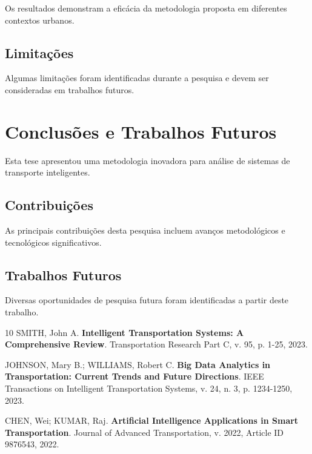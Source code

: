 \documentclass[doutorado,onehalfspacing,12pt,hyperref]{UnB-PPGT}
\begin{document}
Os resultados demonstram a eficácia da metodologia proposta em diferentes contextos urbanos.

\section{Limitações}
\label{sec:limitacoes}

Algumas limitações foram identificadas durante a pesquisa e devem ser consideradas em trabalhos futuros.

\chapter{Conclusões e Trabalhos Futuros}
\label{cap:conclusoes}

Esta tese apresentou uma metodologia inovadora para análise de sistemas de transporte inteligentes.

\section{Contribuições}
\label{sec:contribuicoes}

As principais contribuições desta pesquisa incluem avanços metodológicos e tecnológicos significativos.

\section{Trabalhos Futuros}
\label{sec:futuros}

Diversas oportunidades de pesquisa futura foram identificadas a partir deste trabalho.

\postextual

\begin{thebibliography}{10}
 SMITH, John A. \textbf{Intelligent Transportation Systems: A Comprehensive Review}. Transportation Research Part C, v. 95, p. 1-25, 2023.

 JOHNSON, Mary B.; WILLIAMS, Robert C. \textbf{Big Data Analytics in Transportation: Current Trends and Future Directions}. IEEE Transactions on Intelligent Transportation Systems, v. 24, n. 3, p. 1234-1250, 2023.

 CHEN, Wei; KUMAR, Raj. \textbf{Artificial Intelligence Applications in Smart Transportation}. Journal of Advanced Transportation, v. 2022, Article ID 9876543, 2022.
\end{thebibliography}
\end{document}
